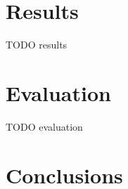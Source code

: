 \documentclass[10pt,a4paper]{article}
\begin{document}
\section{Results}
    TODO results
\section{Evaluation}
    TODO evaluation


\section{Conclusions}




\end{document}
